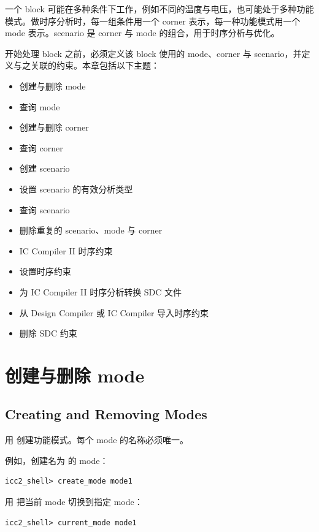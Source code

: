 \label{chap:mcs}

一个 block 可能在多种条件下工作，例如不同的温度与电压，也可能处于多种功能模式。做时序分析时，每一组条件用一个 corner 表示，每一种功能模式用一个 mode 表示。scenario 是 corner 与 mode 的组合，用于时序分析与优化。

开始处理 block 之前，必须定义该 block 使用的 mode、corner 与 scenario，并定义与之关联的约束。本章包括以下主题：
\begin{itemize}
  \item 创建与删除 mode
  \item 查询 mode
  \item 创建与删除 corner
  \item 查询 corner
  \item 创建 scenario
  \item 设置 scenario 的有效分析类型
  \item 查询 scenario
  \item 删除重复的 scenario、mode 与 corner
  \item IC Compiler II 时序约束
  \item 设置时序约束
  \item 为 IC Compiler II 时序分析转换 SDC 文件
  \item 从 Design Compiler 或 IC Compiler 导入时序约束
  \item 删除 SDC 约束
\end{itemize}

\section{创建与删除 mode}
\subsection*{Creating and Removing Modes}

用  创建功能模式。每个 mode 的名称必须唯一。

例如，创建名为  的 mode：
\begin{lstlisting}
icc2_shell> create_mode mode1
\end{lstlisting}

用  把当前 mode 切换到指定 mode：
\begin{lstlisting}
icc2_shell> current_mode mode1
\end{lstlisting}

